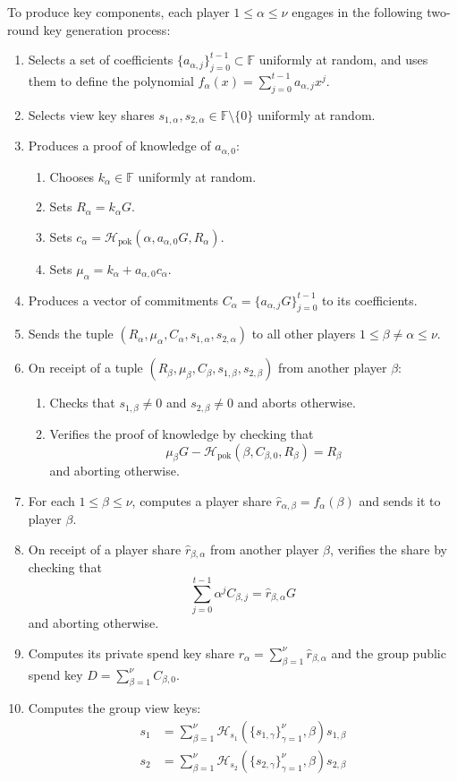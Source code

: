 \documentclass{llncs}
\newcommand{\F}{\mathbb{F}}
\newcommand{\hash}{\mathcal{H}}
\begin{document}
To produce key components, each player $1 \leq \alpha \leq \nu$ engages in the following two-round key generation process:
\begin{enumerate}
    \item Selects a set of coefficients $\{a_{\alpha,j}\}_{j=0}^{t-1} \subset \F$ uniformly at random, and uses them to define the polynomial $f_\alpha(x) = \sum_{j=0}^{t-1} a_{\alpha,j}x^j$.
    \item Selects view key shares $s_{1,\alpha},s_{2,\alpha} \in \F \setminus \{0\}$ uniformly at random.
    \item Produces a proof of knowledge of $a_{\alpha,0}$:
    \begin{enumerate}
        \item Chooses $k_\alpha \in \F$ uniformly at random.
        \item Sets $R_\alpha = k_\alpha G$.
        \item Sets $c_\alpha = \hash_{\text{pok}}(\alpha,a_{\alpha,0}G,R_\alpha)$.
        \item Sets $\mu_\alpha = k_\alpha + a_{\alpha,0}c_\alpha$.
    \end{enumerate}
    \item Produces a vector of commitments $C_\alpha = \{a_{\alpha,j}G\}_{j=0}^{t-1}$ to its coefficients.
    \item Sends the tuple $(R_\alpha,\mu_\alpha,C_\alpha,s_{1,\alpha},s_{2,\alpha})$ to all other players $1 \leq \beta \neq \alpha \leq \nu$.
    \item On receipt of a tuple $(R_\beta,\mu_\beta,C_\beta,s_{1,\beta},s_{2,\beta})$ from another player $\beta$:
    \begin{enumerate}
        \item Checks that $s_{1,\beta} \neq 0$ and $s_{2,\beta} \neq 0$ and aborts otherwise.
        \item Verifies the proof of knowledge by checking that $$\mu_\beta G - \hash_{\text{pok}}(\beta,C_{\beta,0},R_\beta) = R_\beta$$ and aborting otherwise.
    \end{enumerate}
    \item For each $1 \leq \beta \leq \nu$, computes a player share $\widehat{r}_{\alpha,\beta} = f_\alpha(\beta)$ and sends it to player $\beta$.
    \item On receipt of a player share $\widehat{r}_{\beta,\alpha}$ from another player $\beta$, verifies the share by checking that $$\sum_{j=0}^{t-1} \alpha^jC_{\beta,j} = \widehat{r}_{\beta,\alpha}G$$ and aborting otherwise.
    \item Computes its private spend key share $r_\alpha = \sum_{\beta=1}^\nu \widehat{r}_{\beta,\alpha}$ and the group public spend key $D = \sum_{\beta=1}^\nu C_{\beta,0}$.
    \item Computes the group view keys:
    \begin{align*}
        s_1 &= \sum_{\beta=1}^\nu \hash_{s_1}(\{s_{1,\gamma}\}_{\gamma=1}^\nu,\beta)s_{1,\beta} \\
        s_2 &= \sum_{\beta=1}^\nu \hash_{s_2}(\{s_{2,\gamma}\}_{\gamma=1}^\nu,\beta)s_{2,\beta}
    \end{align*}
\end{enumerate}
\end{document}
